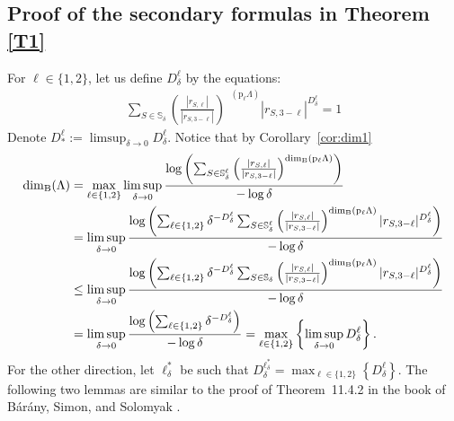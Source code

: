 \documentclass[a4paper, 11pt]{article}
\DeclareMathOperator{\dB}{\dim_{\mathrm{B}}}
\numberwithin{equation}{section}
\theoremstyle{plain}
\theoremstyle{remark}
\theoremstyle{definition}
\begin{document}
\subsection{Proof of the secondary formulas in Theorem \ref{T1}} \label{subsec:secform}
For $\ell \in \{1,2\}$, let us define $D_\delta^\ell$ by the equations:
\begin{align*}
\sum_{S \in \mathbb{S}_\delta}\left(\frac{|r_{S,\ell}|}{|r_{S,3-\ell}|}\right)^{\dB(\mathrm{p}_\ell\Lambda)}|r_{S,3-\ell}|^{D_\delta^\ell} = 1
\end{align*}
Denote $D_*^\ell := \limsup_{\delta \to 0} D_\delta^\ell$. Notice that by Corollary~\ref{cor:dim1}
\begin{align}
\dB(\Lambda) &= \max_{\ell \in \{1,2\}} \limsup_{\delta \to 0} \frac{\log \left(\sum_{S \in \mathbb{S}_\delta^\ell} \left(\frac{|r_{S,\ell}|}{|r_{S,3-\ell}|}\right)^{\dB(\mathrm{p}_\ell\Lambda)}\right)}{-\log\delta} \notag \\
&= \limsup_{\delta \to 0} \frac{\log \left(\sum_{\ell \in \{1,2\}} \delta^{-D_\delta^\ell}\sum_{S \in \mathbb{S}_\delta^\ell} \left(\frac{|r_{S,\ell}|}{|r_{S,3-\ell}|}\right)^{\dB(\mathrm{p}_\ell\Lambda)} |r_{S,3-\ell}|^{D_\delta^\ell} \right)}{-\log\delta} \notag \\
&\leq \limsup_{\delta \to 0} \frac{\log \left(\sum_{\ell \in \{1,2\}} \delta^{-D_\delta^\ell}\sum_{S \in \mathbb{S}_\delta} \left(\frac{|r_{S,\ell}|}{|r_{S,3-\ell}|}\right)^{\dB(\mathrm{p}_\ell\Lambda)} |r_{S,3-\ell}|^{D_\delta^\ell} \right)}{-\log\delta} \notag \\
&= \limsup_{\delta \to 0} \frac{\log \left(\sum_{\ell \in \{1,2\}} \delta^{-D_\delta^\ell}\right)}{-\log\delta} = \max_{\ell \in \{1,2\}} \left\{\limsup_{\delta \to 0} D_\delta^\ell\right\}.\label{eq:2ub}
\end{align}
For the other direction, let $\ell_\delta^*$ be such that $D_\delta^{\ell_\delta^*}= \max_{\ell \in \{1,2\}} \left\{D_\delta^\ell\right\}$. The following two lemmas are similar to the proof of Theorem~11.4.2 in the book of Bárány, Simon, and Solomyak \cite{MR4661364}.
\end{document}
